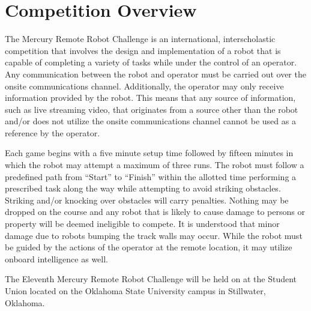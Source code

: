 \section{Competition Overview}
The Mercury Remote Robot Challenge is an international, interscholastic competition that involves the design and implementation of a robot that is capable of completing a variety of tasks while under the control of an operator. Any communication between the robot and operator must be carried out over the onsite communications channel. Additionally, the operator may only receive information provided by the robot. This means that any source of information, such as live streaming video, that originates from a source other than the robot and/or does not utilize the onsite communications channel cannot be used as a reference by the operator.

Each game begins with a five minute setup time followed by fifteen minutes in which the robot may attempt a maximum of three runs. The robot must follow a predefined path from “Start” to “Finish” within the allotted time performing a prescribed task along the way while attempting to avoid striking obstacles. Striking and/or knocking over obstacles will carry penalties. Nothing may be dropped on the course and any robot that is likely to cause damage to persons or property will be deemed ineligible to compete. It is understood that minor damage due to robots bumping the track walls may occur. While the robot must be guided by the actions of the operator at the remote location, it may utilize onboard intelligence as well.

The Eleventh Mercury Remote Robot Challenge will be held on \textbf{\competition} at the Student Union located on the Oklahoma State University campus in Stillwater, Oklahoma.